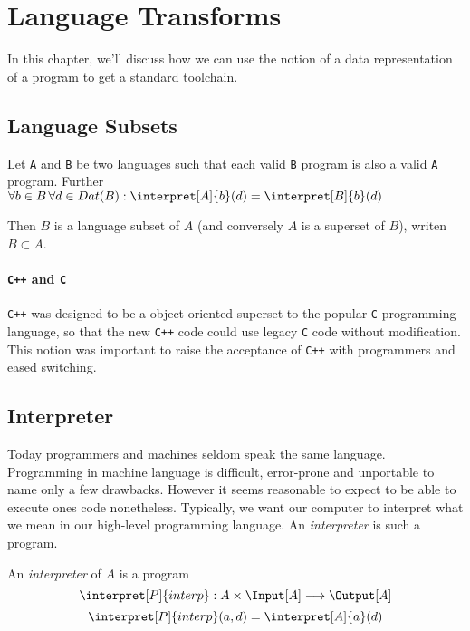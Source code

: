 \section{Language Transforms} %
\label{sec:transforms}
In this chapter, we'll discuss how we can use the notion of a data 
representation of a program to get a standard toolchain.
\subsection{Language Subsets} %
\label{sub:Language Subsets}
\begin{defn}
	Let {\tt A} and {\tt B} be two languages such that each valid {\tt B} 
	program is also a valid {\tt A} program. Further 
	$\forall b\in B\, \forall d\in Dat(B): \interpret[A]{b}(d) = \interpret[B]{b}(d)$

	Then $B$ is a language subset of $A$ (and conversely $A$ is a superset of
	$B$), writen $B \subset A$.
\end{defn}
\paragraph{{\tt C++}  and {\tt C} } %
\label{par:Cpp and C}
{\tt C++} was designed to be a object-oriented superset to the popular {\tt C}
programming language, so that the new {\tt C++} code could use legacy {\tt C}
code without modification. This notion was important to raise the acceptance of
{\tt C++} with programmers and eased switching.
\subsection{Interpreter} %
\label{sub:Interpreter}
Today programmers and machines seldom speak the same language. Programming in 
machine language is difficult, error-prone and unportable to name only a few 
drawbacks. However it seems reasonable to expect to be able to execute ones 
code nonetheless. Typically, we want our computer to interpret what we mean 
in our high-level programming language. An {\em interpreter} is such a program.

\begin{defn}
	An {\em interpreter} of $A$ is a program 
	\[\interpret[P]{interp}: A \times \Input[A] \longrightarrow \Output[A] \]
	\[ \interpret[P]{interp}(a, d) = \interpret[A]{a}(d) \]
\end{defn}


